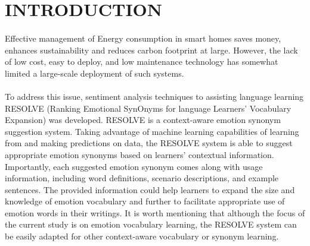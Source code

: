 \documentclass[a4paper,12pt,oneside]{article}
\begin{document}
\newpage
\begin{center}
\tableofcontents
\end{center}



\newpage
\thispagestyle{plain}
\begin{center}
\listoffigures
\end{center}



\newpage
\rfoot{\thepage}
\rfoot{\thepage}
\renewcommand{\headrulewidth}{0.0pt}
\renewcommand{\footrulewidth}{0.0pt}
\renewcommand{\headrulewidth}{0.0pt}
\renewcommand{\footrulewidth}{0.0pt}
\section{INTRODUCTION}
\paragraph{}
Effective management of Energy consumption in smart homes saves money,
enhances sustainability and reduces carbon footprint at
large. However, the lack of low cost, easy to deploy, and low
maintenance technology has somewhat limited a large-scale deployment of such systems.
\paragraph{}
To address this issue, sentiment analysis techniques to assisting language learning RESOLVE (Ranking Emotional SynOnyms for language Learners’ Vocabulary Expansion) was developed. RESOLVE is a context-aware emotion synonym suggestion system. Taking advantage of machine learning capabilities of learning from and making predictions on data, the RESOLVE system is able to suggest appropriate emotion synonyms based on learners’ contextual information. Importantly, each suggested emotion synonym comes along with usage information, including word definitions, scenario descriptions, and example sentences. The provided information could help learners to expand the size and knowledge of emotion vocabulary and further to facilitate appropriate use of emotion words in their writings. It is worth mentioning that although the focus of the current study is on emotion vocabulary learning, the RESOLVE system can be easily adapted for other context-aware vocabulary or synonym learning. 
\end{document}
